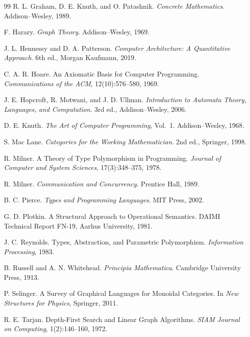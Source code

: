 \documentclass[12pt,oneside]{article}
\begin{document}
\begin{thebibliography}{99}
R. L. Graham, D. E. Knuth, and O. Patashnik.
\newblock \emph{Concrete Mathematics}.
\newblock Addison--Wesley, 1989.

F. Harary.
\newblock \emph{Graph Theory}.
\newblock Addison--Wesley, 1969.

J. L. Hennessy and D. A. Patterson.
\newblock \emph{Computer Architecture: A Quantitative Approach}.
\newblock 6th ed., Morgan Kaufmann, 2019.

C. A. R. Hoare.
\newblock An Axiomatic Basis for Computer Programming.
\newblock \emph{Communications of the ACM}, 12(10):576--580, 1969.

J. E. Hopcroft, R. Motwani, and J. D. Ullman.
\newblock \emph{Introduction to Automata Theory, Languages, and Computation}.
\newblock 3rd ed., Addison--Wesley, 2006.

D. E. Knuth.
\newblock \emph{The Art of Computer Programming}, Vol.~1.
\newblock Addison--Wesley, 1968.

S. Mac Lane.
\newblock \emph{Categories for the Working Mathematician}.
\newblock 2nd ed., Springer, 1998.

R. Milner.
\newblock A Theory of Type Polymorphism in Programming.
\newblock \emph{Journal of Computer and System Sciences}, 17(3):348--375, 1978.

R. Milner.
\newblock \emph{Communication and Concurrency}.
\newblock Prentice Hall, 1989.

B. C. Pierce.
\newblock \emph{Types and Programming Languages}.
\newblock MIT Press, 2002.

G. D. Plotkin.
\newblock A Structural Approach to Operational Semantics.
\newblock DAIMI Technical Report FN-19, Aarhus University, 1981.

J. C. Reynolds.
\newblock Types, Abstraction, and Parametric Polymorphism.
\newblock \emph{Information Processing}, 1983.

B. Russell and A. N. Whitehead.
\newblock \emph{Principia Mathematica}.
\newblock Cambridge University Press, 1913.

P. Selinger.
\newblock A Survey of Graphical Languages for Monoidal Categories.
\newblock In \emph{New Structures for Physics}, Springer, 2011.

R. E. Tarjan.
\newblock Depth-First Search and Linear Graph Algorithms.
\newblock \emph{SIAM Journal on Computing}, 1(2):146--160, 1972.


\end{thebibliography}
\end{document}
